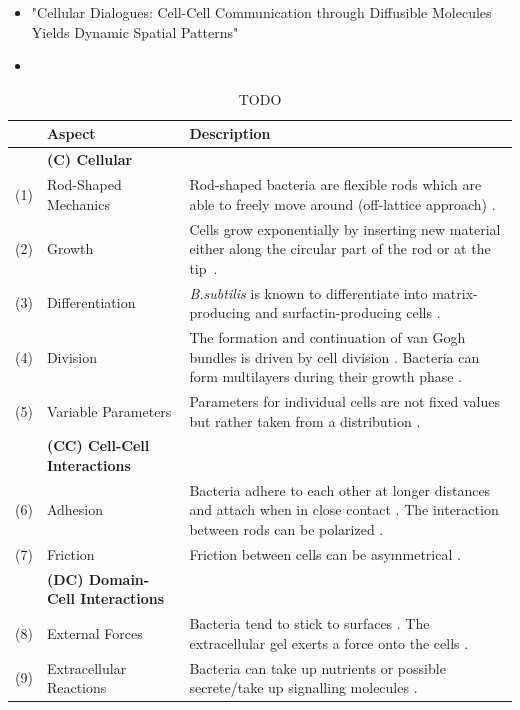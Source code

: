 \documentclass{article}
\begin{document}
\begin{itemize}
    \item \cite{Dang2020} "Cellular Dialogues: Cell-Cell Communication through Diffusible Molecules
        Yields Dynamic Spatial Patterns"
    \item 
\end{itemize}

\begin{table}[H]
    \centering
    \def\arraystretch{1.3}
    \begin{tabularx}{\textwidth}{c l X}
        &\textbf{Aspect} & \textbf{Description}\\
        \toprule
        &\textbf{(C) Cellular}\\
        \midrule
        (1) & Rod-Shaped Mechanics &
            Rod-shaped bacteria are flexible rods which are able to freely move around (off-lattice
            approach) \cite{Takeuchi2005,Ursell2014,Amir2014_2}.\\
        (2) & Growth &
            Cells grow exponentially by inserting new material either along the circular part of the
            rod or at the tip~\cite{Robert2014,Takeuchi2005}.\\
        (3) & Differentiation &
            \textit{B.subtilis} is known to differentiate into matrix-producing and
            surfactin-producing cells \cite{vanGestel2015,Lpez2010}.\\
        (4) & Division &
            The formation and continuation of van Gogh bundles is driven by cell division
            \cite{vanGestel2015}.
            Bacteria can form multilayers during their growth phase \cite{Duvernoy2018}.\\
        (5) & Variable Parameters &
            Parameters for individual cells are not fixed values but rather taken from a
            distribution \cite{Koutsoumanis2013}.\\
        &\textbf{(CC) Cell-Cell Interactions}\\
        \midrule
        (6) & Adhesion &
            Bacteria adhere to each other at longer distances and attach when in close contact
            \cite{Verwey1947,Trejo2013}.
            The interaction between rods can be polarized \cite{Duvernoy2018}.\\
        (7) & Friction &
            Friction between cells \cite{Grant2014} can be asymmetrical \cite{Doumic2020}.\\
        &\textbf{(DC) Domain-Cell Interactions}\\
        \midrule
        (8) & External Forces &
            Bacteria tend to stick to surfaces \cite{vanLoosdrecht1989}.
            The extracellular gel exerts a force onto the cells \cite{Grant2014}.\\
        (9) & Extracellular Reactions &
            Bacteria can take up nutrients or possible secrete/take up signalling molecules
            \cite{Li2025}.\\
        \bottomrule
    \end{tabularx}
    \label{table:simulation-aspects-supplement}
    \caption{TODO}
\end{table}
\end{document}
